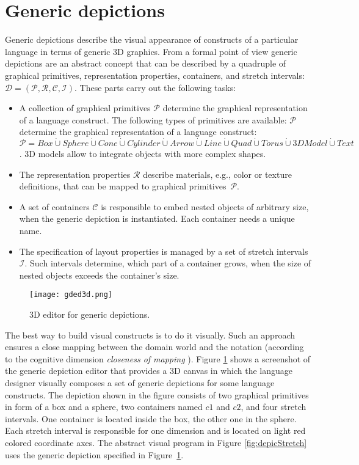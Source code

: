 \documentclass[a4paper]{article}
\newcommand{\dotcup}{\mathbin{\dot{\cup}}}
\begin{document}
\section{Generic depictions}
\label{sec:genDepic}
Generic depictions describe the visual appearance of constructs of a particular language in terms of generic 3D graphics.
From a formal point of view generic depictions are an abstract concept that can be described by a quadruple of graphical primitives, representation properties, containers, and stretch intervals: $\mathcal{D} = (\mathcal{P}, \mathcal{R}, \mathcal{C}, \mathcal{I})$. These parts carry out the following tasks:

\begin{itemize}
  \item A collection of graphical primitives $\mathcal{P}$ determine the graphical representation of a language construct. The following types of primitives are available:  $\mathcal{P}$ determine the graphical representation of a language construct:  $\mathcal{P} = Box \dotcup Sphere \dotcup Cone \dotcup Cylinder \dotcup Arrow \dotcup Line \dotcup Quad \dotcup Torus \dotcup 3DModel \dotcup Text$. 3D models allow to integrate objects with more complex shapes.
  \item The representation properties $\mathcal{R}$ describe materials, e.g., color or texture definitions, that can be mapped to graphical primitives~$\mathcal{P}$.
  \item A set of containers $\mathcal{C}$ is responsible to embed nested objects of arbitrary size, when the generic depiction is instantiated. Each container needs a unique name.
  \item The specification of layout properties is managed by a set of stretch intervals $\mathcal{I}$. Such intervals determine, which part of a container grows, when the size of nested objects exceeds the container's size.
\end{itemize}

\begin{figure}[!ht]
  \centering
  \texttt{[image: gded3d.png]}
  \caption{3D editor for generic depictions.}
  \label{fig:gded3d}
\end{figure}

The best way to build visual constructs is to do it visually. Such an approach ensures a close mapping between the domain world and the notation (according to the cognitive dimension \emph{closeness of mapping} \cite{GP96}). Figure \ref{fig:gded3d} shows a screenshot of the generic depiction editor that provides a 3D canvas in which the language designer visually composes a set of generic depictions for some language constructs. The depiction shown in the figure consists of two graphical primitives in form of a box and a sphere, two containers named $c1$ and $c2$, and four stretch intervals. One container is located inside the box, the other one in the sphere. Each stretch interval is responsible for one dimension and is located on light red colored coordinate axes. The abstract visual program in Figure \ref{fig:depicStretch} uses the generic depiction specified in Figure~\ref{fig:gded3d}.
\end{document}
